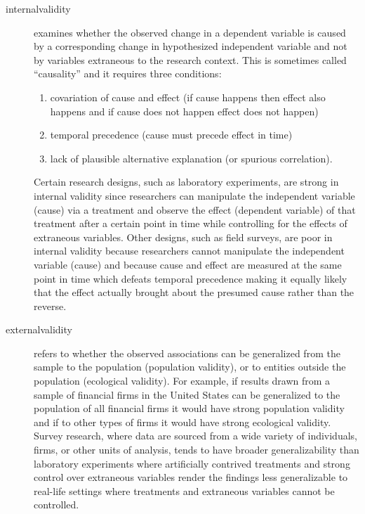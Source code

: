 \begin{description}
	\item[\Gls{internalvalidity}] examines whether the observed change in a dependent variable is caused by a corresponding change in hypothesized independent variable and not by variables extraneous to the research context. This is sometimes called ``causality'' and it requires three conditions: 
	
	
	\begin{enumerate}
		\item covariation of cause and effect (if cause happens then effect also happens and if cause does not happen effect does not happen)
		\item temporal precedence (cause must precede effect in time)
		\item lack of plausible alternative explanation (or spurious correlation). 
	\end{enumerate}
	
	Certain research designs, such as laboratory experiments, are strong in internal validity since researchers can manipulate the independent variable (cause) via a treatment and observe the effect (dependent variable) of that treatment after a certain point in time while controlling for the effects of extraneous variables. Other designs, such as field surveys, are poor in internal validity because researchers cannot manipulate the independent variable (cause) and because cause and effect are measured at the same point in time which defeats temporal precedence making it equally likely that the effect actually brought about the presumed cause rather than the reverse. 
	
	\item[\Gls{externalvalidity}] refers to whether the observed associations can be generalized from the sample to the population (population validity), or to entities outside the population (ecological validity). For example, if results drawn from a sample of financial firms in the United States can be generalized to the population of all financial firms it would have strong population validity and if to other types of firms it would have strong ecological validity. Survey research, where data are sourced from a wide variety of individuals, firms, or other units of analysis, tends to have broader generalizability than laboratory experiments where artificially contrived treatments and strong control over extraneous variables render the findings less generalizable to real-life settings where treatments and extraneous variables cannot be controlled. 
	

\end{description}
